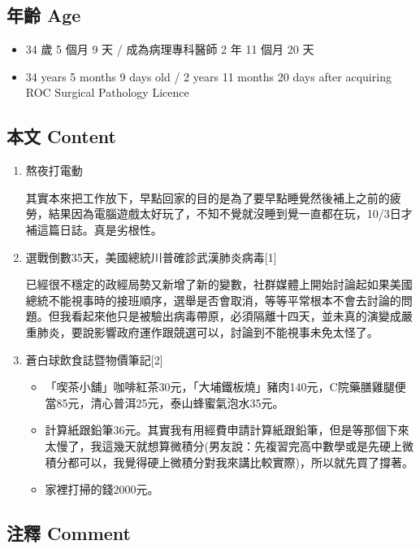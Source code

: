 \documentclass[a5paper, 11pt
]{book}
\providecommand{\tightlist}{%
  \setlength{\itemsep}{0pt}\setlength{\parskip}{0pt}}
\begin{document}
\hypertarget{ux5e74ux9f61-age-29}{%
\subsection{年齡 Age}\label{ux5e74ux9f61-age-29}}

\begin{itemize}
\tightlist
\item
  34 歲 5 個月 9 天 / 成為病理專科醫師 2 年 11 個月 20 天
\item
  34 years 5 months 9 days old / 2 years 11 months 20 days after
  acquiring ROC Surgical Pathology Licence
\end{itemize}

\hypertarget{ux672cux6587-content-29}{%
\subsection{本文 Content}\label{ux672cux6587-content-29}}

\begin{enumerate}
\def\labelenumi{\arabic{enumi}.}
\item
  熬夜打電動

  其實本來把工作放下，早點回家的目的是為了要早點睡覺然後補上之前的疲勞，結果因為電腦遊戲太好玩了，不知不覺就沒睡到覺一直都在玩，10/3日才補這篇日誌。真是劣根性。
\item
  選戰倒數35天，美國總統川普確診武漢肺炎病毒{[}1{]}

  已經很不穩定的政經局勢又新增了新的變數，社群媒體上開始討論起如果美國總統不能視事時的接班順序，選舉是否會取消，等等平常根本不會去討論的問題。但我看起來他只是被驗出病毒帶原，必須隔離十四天，並未真的演變成嚴重肺炎，要說影響政府運作跟競選可以，討論到不能視事未免太怪了。
\item
  蒼白球飲食誌暨物價筆記{[}2{]}

  \begin{itemize}
  \tightlist
  \item
    「喫茶小舖」咖啡紅茶30元，「大埔鐵板燒」豬肉140元，C院藥膳雞腿便當85元，清心普洱25元，泰山蜂蜜氣泡水35元。
  \item
    計算紙跟鉛筆36元。其實我有用經費申請計算紙跟鉛筆，但是等那個下來太慢了，我這幾天就想算微積分(男友說：先複習完高中數學或是先硬上微積分都可以，我覺得硬上微積分對我來講比較實際)，所以就先買了撐著。
  \item
    家裡打掃的錢2000元。
  \end{itemize}
\end{enumerate}

\hypertarget{ux6ce8ux91cb-comment-29}{%
\subsection{注釋 Comment}\label{ux6ce8ux91cb-comment-29}}
\end{document}
